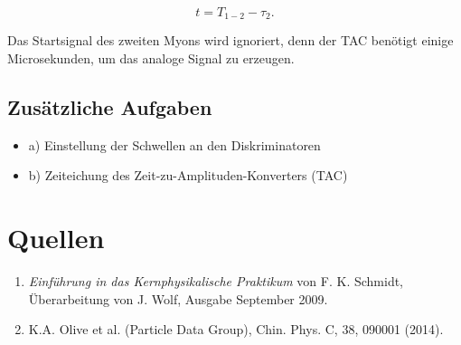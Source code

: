 \documentclass[a4paper,ngerman]{scrartcl}
\begin{document}
\begin{equation}
t = T_{1-2} - \tau_2 .
\end{equation}

Das Startsignal des zweiten Myons wird ignoriert, denn der TAC benötigt einige Microsekunden, um das analoge Signal zu erzeugen.



\subsection{Zusätzliche Aufgaben}

\begin{itemize}
\item a) Einstellung der Schwellen an den Diskriminatoren
\item b) Zeiteichung des Zeit-zu-Amplituden-Konverters (TAC)
\end{itemize}



\clearpage
\section{Quellen}
\begin{enumerate}
\item \emph{Einführung in das Kernphysikalische Praktikum} von F. K. Schmidt, 
  Überarbeitung von J. Wolf, Ausgabe September 2009. \label{ref:bb}
\item K.A. Olive et al. (Particle Data Group), Chin. Phys. C, 38, 090001 (2014). \label{ref:pdg14}
\end{enumerate}
\end{document}
